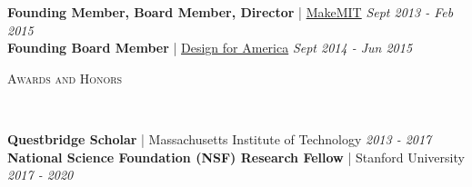 \documentclass[9pt]{article}
\newenvironment{changemargin}[2]{%
  \begin{list}{}{%
    \setlength{\topsep}{0pt}%
    \setlength{\leftmargin}{#1}%
    \setlength{\rightmargin}{#2}%
    \setlength{\listparindent}{\parindent}%
    \setlength{\itemindent}{\parindent}%
    \setlength{\parsep}{\parskip}%
  }%
  \item[]}{\end{list}
}
\newcommand{\lineover}{
	\begin{changemargin}{-0.05in}{-0.05in}
		\vspace*{-8pt}
		\hrulefill \\
		\vspace*{-2pt}
	\end{changemargin}
}
\newcommand{\header}[1]{
	\begin{changemargin}{-0.5in}{-0.5in}
		\scshape{#1}\\
  	\lineover
	\end{changemargin}
}
\newenvironment{body} {
	\vspace*{-16pt}
	\begin{changemargin}{-0.25in}{-0.5in}
  }	
	{\end{changemargin}
}
\begin{document}
\begin{body}
	\vspace{14pt}
	\textbf{Founding Member, Board Member, Director} | \href{https://makemit.org/}{MakeMIT} \hfill {} \emph{Sept 2013 - Feb 2015}\\
	\smallskip
	\textbf{Founding Board Member} | \href{http://edgerton.mit.edu/clubs-teams/design-america}{Design for America} \hfill{} \emph{Sept 2014 - Jun 2015}\\
\end{body}
\smallskip
\header{Awards and Honors}
\begin{body}
	\vspace{14pt}
	\textbf{Questbridge Scholar} | Massachusetts Institute of Technology \hfill{} \emph{2013 - 2017}\\
	\smallskip
	\textbf{National Science Foundation (NSF) Research Fellow} | Stanford University \hfill{} \emph{2017 - 2020}
\end{body}
\smallskip
\end{document}
